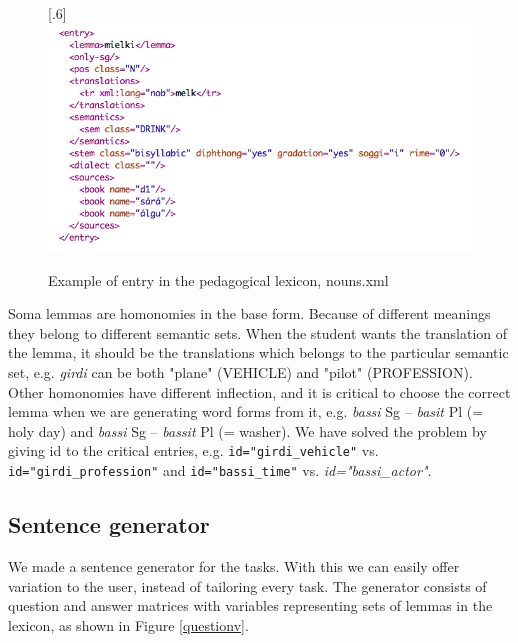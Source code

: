 \documentclass[a4paper,12pt]{article}
\begin{document}
\begin{figure}[htbp]
\begin{center}
\scalebox{.6}[.6]{\includegraphics{img/nounlexicon.png}}\\
\caption{Example of entry in the pedagogical lexicon, nouns.xml}
\label{nounlex}
\end{center}
\end{figure}

Soma lemmas are homonomies in the base form. Because of different meanings they belong to different semantic sets. When the student wants the translation of the lemma, it should be the translations which belongs to the particular semantic set, e.g. \textit{girdi} can be both "plane" (VEHICLE) and "pilot" (PROFESSION). Other homonomies have different inflection, and it is critical to choose the correct lemma when we are generating word forms from it, e.g. \textit{bassi} Sg -- \textit{basit} Pl (= holy day) and \textit{bassi} Sg -- \textit{bassit} Pl (= washer). We have solved the problem by giving id to the critical entries, e.g. \texttt{id="girdi\_vehicle"} vs. 
\texttt{id="girdi\_profession"} and \texttt{id="bassi\_time"} vs. \textit{id="bassi\_actor"}.


\subsection{Sentence generator}\label{set}
We made a sentence generator for the tasks. With this we can easily offer variation to the user, instead of tailoring every task. The generator consists of question and answer matrices with variables representing sets of lemmas in the lexicon, as shown in Figure \ref{questionv}.
\end{document}
